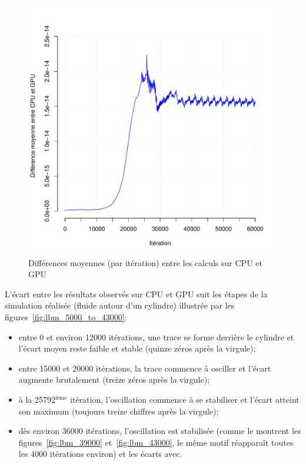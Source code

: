 \begin{figure}[H]
	\centering
	\includegraphics[scale=0.87, fbox]{../data/lbm_cpu_vs_gpu/deltas/Rplots.pdf}
	\caption{Différences moyennes (par itération) entre les calculs sur \acs{CPU} et \acs{GPU}}
	\label{fig:lbm_float_deltas}
\end{figure}

L'écart entre les résultats observés sur \ac{CPU} et \ac{GPU} suit les étapes de la simulation réalisée (fluide autour d'un cylindre) illustrée par les figures~\ref{fig:lbm_5000_to_43000}:
\begin{itemize}
	\item entre 0 et environ 12000 itérations, une trace se forme derrière le cylindre et l'écart moyen reste faible et stable (quinze zéros après la virgule);
	\item entre 15000 et 20000 itérations, la trace commence à osciller et l'écart augmente brutalement (treize zéros après la virgule);
	\item à la 25792$^{\textrm{ième}}$ itération, l'oscillation commence à se stabiliser et l'écart atteint son maximum (toujours treize chiffres après la virgule);
	\item dès environ 36000 itérations, l'oscillation est stabilisée (comme le montrent les figures~\ref{fig:lbm_39000} et~\ref{fig:lbm_43000}, le même motif réapparaît toutes les 4000 itérations environ) et les écarts avec.
\end{itemize}

